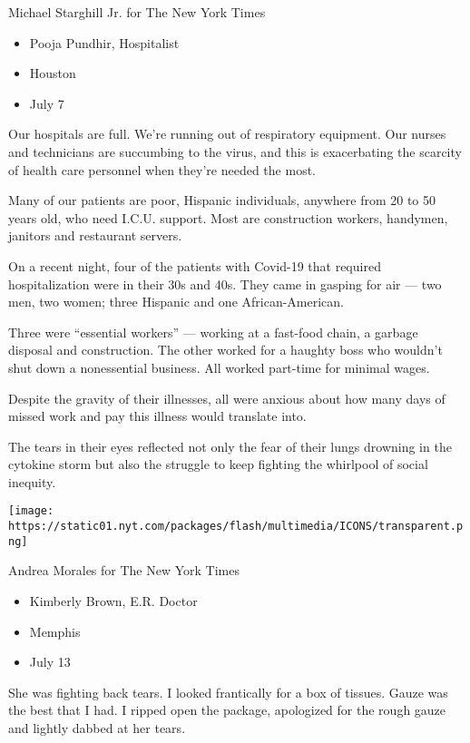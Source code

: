 Michael Starghill Jr. for The New York Times

\begin{itemize}
\tightlist
\item
  Pooja Pundhir, Hospitalist
\item
  Houston
\item
  July 7
\end{itemize}

Our hospitals are full. We're running out of respiratory equipment. Our
nurses and technicians are succumbing to the virus, and this is
exacerbating the scarcity of health care personnel when they're needed
the most.

Many of our patients are poor, Hispanic individuals, anywhere from 20 to
50 years old, who need I.C.U. support. Most are construction workers,
handymen, janitors and restaurant servers.

On a recent night, four of the patients with Covid-19 that required
hospitalization were in their 30s and 40s. They came in gasping for air
--- two men, two women; three Hispanic and one African-American.

Three were ``essential workers'' --- working at a fast-food chain, a
garbage disposal and construction. The other worked for a haughty boss
who wouldn't shut down a nonessential business. All worked part-time for
minimal wages.

Despite the gravity of their illnesses, all were anxious about how many
days of missed work and pay this illness would translate into.

The tears in their eyes reflected not only the fear of their lungs
drowning in the cytokine storm but also the struggle to keep fighting
the whirlpool of social inequity.

\texttt{[image: https://static01.nyt.com/packages/flash/multimedia/ICONS/transparent.png]}

Andrea Morales for The New York Times

\begin{itemize}
\tightlist
\item
  Kimberly Brown, E.R. Doctor
\item
  Memphis
\item
  July 13
\end{itemize}

She was fighting back tears. I looked frantically for a box of tissues.
Gauze was the best that I had. I ripped open the package, apologized for
the rough gauze and lightly dabbed at her tears.

